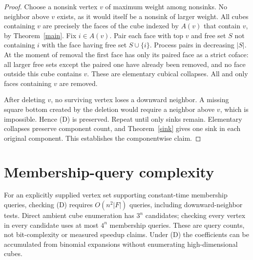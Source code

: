 \documentclass[11pt,a4paper]{article}
\begin{document}
\begin{proof}
Choose a nonsink vertex $v$ of maximum weight among nonsinks. No neighbor above $v$ exists, as it would itself be a nonsink of larger weight. All cubes containing $v$ are precisely the faces of the cube indexed by $A(v)$ that contain $v$, by Theorem~\ref{main}. Fix $i\in A(v)$. Pair each face with top $v$ and free set $S$ not containing $i$ with the face having free set $S\cup\{i\}$. Process pairs in decreasing $|S|$. At the moment of removal the first face has only its paired face as a strict coface: all larger free sets except the paired one have already been removed, and no face outside this cube contains $v$. These are elementary cubical collapses. All and only faces containing $v$ are removed.

After deleting $v$, no surviving vertex loses a downward neighbor. A missing square bottom created by the deletion would require a neighbor above $v$, which is impossible. Hence (D) is preserved. Repeat until only sinks remain. Elementary collapses preserve component count, and Theorem~\ref{sink} gives one sink in each original component. This establishes the componentwise claim.
\end{proof}
\section{Membership-query complexity}
For an explicitly supplied vertex set supporting constant-time membership queries, checking (D) requires $O(n^2|F|)$ queries, including downward-neighbor tests. Direct ambient cube enumeration has $3^n$ candidates; checking every vertex in every candidate uses at most $4^n$ membership queries. These are query counts, not bit-complexity or measured speedup claims. Under (D) the coefficients can be accumulated from binomial expansions without enumerating high-dimensional cubes.
\end{document}
